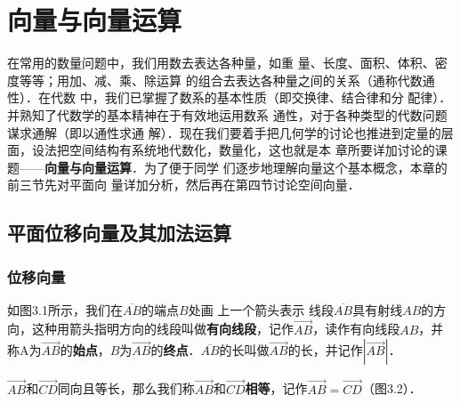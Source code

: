 \chapter{向量与向量运算}
在常用的数量问题中，我们用数去表达各种量，如重
量、长度、面积、体积、密度等等；用加、减、乘、除运算
的组合去表达各种量之间的关系（通称代数通性）．在代数
中，我们已掌握了数系的基本性质（即交换律、结合律和分
配律）．并熟知了代数学的基本精神在于有效地运用数系
通性，对于各种类型的代数问题谋求通解（即以通性求通
解）．现在我们要着手把几何学的讨论也推进到定量的层
面，设法把空间结构有系统地代数化，数量化，这也就是本
章所要详加讨论的课题——\textbf{向量与向量运算}．为了便于同学
们逐步地理解向量这个基本概念，本章的前三节先对平面向
量详加分析，然后再在第四节讨论空间向量．

\section{平面位移向量及其加法运算}

\subsection{位移向量}

如图3.1所示，我们在$\overline{AB}$的端点$B$处画	
上一个箭头表示 线段$\overline{AB}$具有射线$AB$的方向，这种用箭头指明方向的线段叫做\textbf{有向线段}，记作$\Vec{AB}$，读作有向线段$AB$，并称A为$\Vec{AB}$的\textbf{始点}，$B$为$\Vec{AB}$的\textbf{终点}．$\overline{AB}$的长叫做$\Vec{AB}$的长，并记作$|\Vec{AB}|$．

$\Vec{AB}$和$\Vec{CD}$同向且等长，那么我们称$\Vec{AB}$和$\Vec{CD}$\textbf{相等}，记作$\Vec{AB}=\Vec{CD}$（图3.2）．

\begin{figure}[htp]\centering
    \begin{minipage}[t]{0.48\textwidth}
    \centering
{}
    \caption{}
    \end{minipage}
    \begin{minipage}[t]{0.48\textwidth}
    \centering
    \caption{}
    \end{minipage}
    \end{figure}

